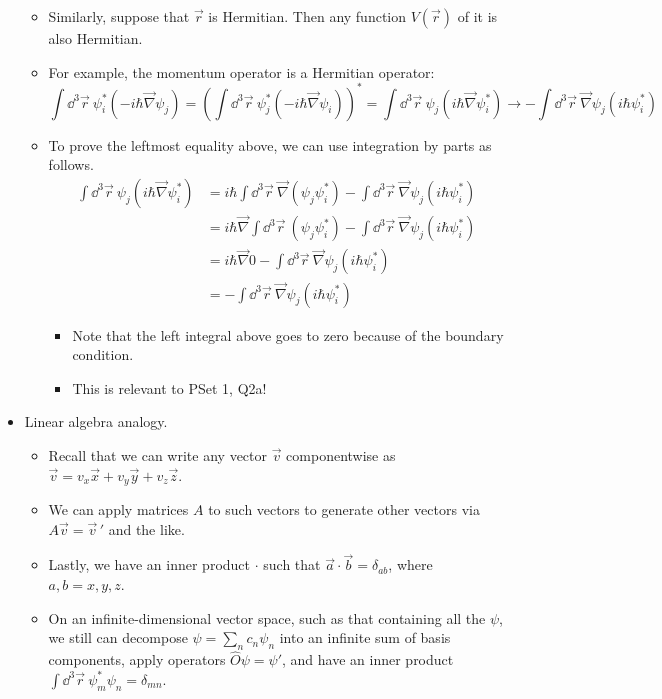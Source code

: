 \documentclass[../notes.tex]{subfiles}
\begin{document}
\begin{itemize}
\begin{itemize}
        \item Similarly, suppose that $\vec{r}$ is Hermitian. Then any function $V(\vec{r})$ of it is also Hermitian.
        \item For example, the momentum operator is a Hermitian operator:
        \begin{equation*}
            \int\dd^3\vec{r}\ \psi_i^*(-i\hbar\vec{\nabla}\psi_j) = \left( \int\dd^3\vec{r}\ \psi_j^*(-i\hbar\vec{\nabla}\psi_i) \right)^*
            = \int\dd^3\vec{r}\ \psi_j(i\hbar\vec{\nabla}\psi_i^*)
            \to -\int\dd^3\vec{r}\ \vec{\nabla}\psi_j(i\hbar\psi_i^*)
        \end{equation*}
        \item To prove the leftmost equality above, we can use integration by parts as follows.
        \begin{align*}
            \int\dd^3\vec{r}\ \psi_j(i\hbar\vec{\nabla}\psi_i^*) &= i\hbar\int\dd^3\vec{r}\ \vec{\nabla}(\psi_j\psi_i^*)-\int\dd^3\vec{r}\ \vec{\nabla}\psi_j(i\hbar\psi_i^*)\\
            &= i\hbar\vec{\nabla}\int\dd^3\vec{r}\ (\psi_j\psi_i^*)-\int\dd^3\vec{r}\ \vec{\nabla}\psi_j(i\hbar\psi_i^*)\\
            &= i\hbar\vec{\nabla}0-\int\dd^3\vec{r}\ \vec{\nabla}\psi_j(i\hbar\psi_i^*)\\
            &= -\int\dd^3\vec{r}\ \vec{\nabla}\psi_j(i\hbar\psi_i^*)
        \end{align*}
        \begin{itemize}
            \item Note that the left integral above goes to zero because of the boundary condition.
            \item This is relevant to PSet 1, Q2a!
        \end{itemize}
    \end{itemize}
    \item Linear algebra analogy.
    \begin{itemize}
        \item Recall that we can write any vector $\vec{v}$ componentwise as $\vec{v}=v_x\vec{x}+v_y\vec{y}+v_z\vec{z}$.
        \item We can apply matrices $A$ to such vectors to generate other vectors via $A\vec{v}=\vec{v}{\,}'$ and the like.
        \item Lastly, we have an inner product $\cdot$ such that $\vec{a}\cdot\vec{b}=\delta_{ab}$, where $a,b=x,y,z$.
        \item On an infinite-dimensional vector space, such as that containing all the $\psi$, we still can decompose $\psi=\sum_nc_n\psi_n$ into an infinite sum of basis components, apply operators $\hat{O}\psi=\psi'$, and have an inner product $\int\dd^3\vec{r}\ \psi^*_m\psi_n=\delta_{mn}$.

\end{itemize}
\end{itemize}
\end{document}
